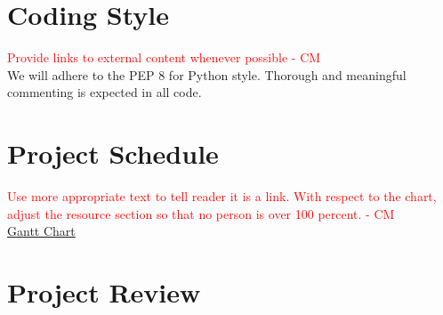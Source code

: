 \documentclass{article}
\begin{document}
\section{Coding Style} %

\textcolor{red}{Provide links to external content whenever possible  - CM} \\
We will adhere to the PEP 8 for Python style. Thorough and meaningful commenting is expected in all code.

\section{Project Schedule}


\textcolor{red}{Use more appropriate text to tell reader it is a link. With respect to the chart, adjust the resource section so that no person is over 100 percent. - CM} \\
 \href{run:GanttChart.gan} {Gantt Chart}

\section{Project Review} 
\end{document}
